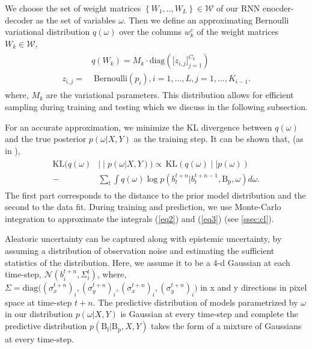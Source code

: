 We choose the set of weight matrices $\left\{ W_{1},..,W_{L}\right\}\in\mathcal{W}$ of our RNN enocder-decoder as the set of variables $\omega$. Then we define an approximating Bernoulli variational distribution $q(\omega)$ over the columns $w_{k}^{c}$ of the weight matrices $W_{k} \in \mathcal{W}$,
\begin{align}\label{eq4}
    \begin{split}
        &q(W_{k}) = M_{k} \cdot \text{diag}(\lbrack z_{i,j}\rbrack^{C_{k}}_{j=1})\\
        z_{i,j} = &\;\text{Bernoulli}(p_{i}), i = 1, ..., L, j = 1, ..., K_{i - 1}.
    \end{split}
\end{align}
where, $M_{k}$ are the variational parameters. This distribution allows for efficient sampling during training and testing which we discuss in the following subsection.

For an accurate approximation, we minimize the KL divergence between $q(\omega)$ and the true posterior $p(\omega | X,Y)$ as the training step. It can be shown that, (as in \cite{gal2016dropout,Gal2016Bayesian}),
\begin{align}\label{eq3}
    \begin{split}
        \text{KL}(q(\omega) & \mid\mid p(\omega | X,Y)) \propto \,\text{KL}(q(\omega)\mid\mid p(\omega)) \\
        - &\sum_{t} \int q(\omega) \log p(b_{t}^{t+n} | b_{t}^{t+n-1}, \text{B}_{\text{p}}, \omega) d\omega.
    \end{split}
\end{align}
The first part corresponds to the distance to the prior model distribution and the second to the data fit. During training and prediction, we use Monte-Carlo integration to approximate the integrals (\ref{eq2}) and (\ref{eq3}) (see \autoref{ssec:cl}).

Aleatoric uncertainty can be captured along with epistemic uncertainty, by assuming a distribution of observation noise and estimating the sufficient statistics of the distribution. Here, we assume it to be a 4-d Gaussian at each time-step, $\mathcal{N}(b_{i}^{t+n},\Sigma_{i}^{t})$, where, $\Sigma=\text{diag}\big((\sigma_{x}^{t+n})_{i},(\sigma_{y}^{t+n})_{i},(\sigma_{x}^{t+n})_{i},(\sigma_{y}^{t+n})_{i}\big)$ in x and y directions in pixel space at time-step $t+n$. The predictive distribution of models parametrized by $\omega$ in our distribution $p( \omega | X, Y )$ is Gaussian at every time-step and complete the predictive distribution $p(\text{B}_{\text{f}} | \text{B}_{\text{p}}, X, Y)$ takes the form of a mixture of Gaussians at every time-step. 

